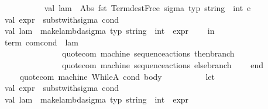 \begin{isabellebody}
\ \ \ \ \ \ \ \ \ \isanewline
\ \ \ \ \ \ val\ lam\ {\isacharequal}{\kern0pt}\ Abs\ {\isacharparenleft}{\kern0pt}fst\ {\isacharparenleft}{\kern0pt}Term{\isachardot}{\kern0pt}dest{\isacharunderscore}{\kern0pt}Free\ sigma{\isacharparenright}{\kern0pt}{\isacharcomma}{\kern0pt}\ {\isacharat}{\kern0pt}{\isacharbraceleft}{\kern0pt}typ\ {\isachardoublequote}{\kern0pt}string\ {\isasymRightarrow}\ int{\isachardoublequote}{\kern0pt}{\isacharbraceright}{\kern0pt}{\isacharcomma}{\kern0pt}\ e{\isacharprime}{\kern0pt}{\isacharparenright}{\kern0pt}{\isacharasterisk}{\kern0pt}{\isacharparenright}{\kern0pt}\isanewline
\isanewline
\ \ \ \ \ \ val\ expr\ {\isacharequal}{\kern0pt}\ subst{\isacharunderscore}{\kern0pt}with{\isacharunderscore}{\kern0pt}sigma\ cond\isanewline
\ \ \ \ \ \ val\ lam\ {\isacharequal}{\kern0pt}\ make{\isacharunderscore}{\kern0pt}lambda{\isacharunderscore}{\kern0pt}sigma\ {\isacharat}{\kern0pt}{\isacharbraceleft}{\kern0pt}typ\ {\isachardoublequote}{\kern0pt}string\ {\isasymRightarrow}\ int{\isachardoublequote}{\kern0pt}{\isacharbraceright}{\kern0pt}\ {\isachardoublequote}{\kern0pt}{\isasymsigma}{\isachardoublequote}{\kern0pt}\ expr\isanewline
\ \ \ \ in\isanewline
\ \ \ \ \ \ {\isacharat}{\kern0pt}{\isacharbraceleft}{\kern0pt}term\ com{\isachardot}{\kern0pt}cond{\isacharbraceright}{\kern0pt}\ {\isachardollar}{\kern0pt}\ lam\ \isanewline
\ \ \ \ \ \ \ \ \ \ \ \ \ \ \ \ \ \ \ {\isachardollar}{\kern0pt}\ quote{\isacharunderscore}{\kern0pt}com\ machine\ {\isacharparenleft}{\kern0pt}sequence{\isacharunderscore}{\kern0pt}actions\ then{\isacharunderscore}{\kern0pt}branch{\isacharparenright}{\kern0pt}\isanewline
\ \ \ \ \ \ \ \ \ \ \ \ \ \ \ \ \ \ \ {\isachardollar}{\kern0pt}\ quote{\isacharunderscore}{\kern0pt}com\ machine\ {\isacharparenleft}{\kern0pt}sequence{\isacharunderscore}{\kern0pt}actions\ else{\isacharunderscore}{\kern0pt}branch{\isacharparenright}{\kern0pt}\isanewline
\ \ \ \ end\isanewline
\ \ \ \ \ \ \isanewline
\ \ {\isacharbar}{\kern0pt}\ quote{\isacharunderscore}{\kern0pt}com\ machine\ {\isacharparenleft}{\kern0pt}WhileA\ {\isacharparenleft}{\kern0pt}cond{\isacharcomma}{\kern0pt}\ body{\isacharparenright}{\kern0pt}{\isacharparenright}{\kern0pt}\ {\isacharequal}{\kern0pt}\isanewline
\ \ \ \ \ \ \ \ \ let\isanewline
\ \ \ \ \ \ val\ expr\ {\isacharequal}{\kern0pt}\ subst{\isacharunderscore}{\kern0pt}with{\isacharunderscore}{\kern0pt}sigma\ cond\ \isanewline
\ \ \ \ \ \ val\ lam\ {\isacharequal}{\kern0pt}\ make{\isacharunderscore}{\kern0pt}lambda{\isacharunderscore}{\kern0pt}sigma\ {\isacharat}{\kern0pt}{\isacharbraceleft}{\kern0pt}typ\ {\isachardoublequote}{\kern0pt}string\ {\isasymRightarrow}\ int{\isachardoublequote}{\kern0pt}{\isacharbraceright}{\kern0pt}\ {\isachardoublequote}{\kern0pt}{\isasymsigma}{\isachardoublequote}{\kern0pt}\ expr\isanewline

\end{isabellebody}
